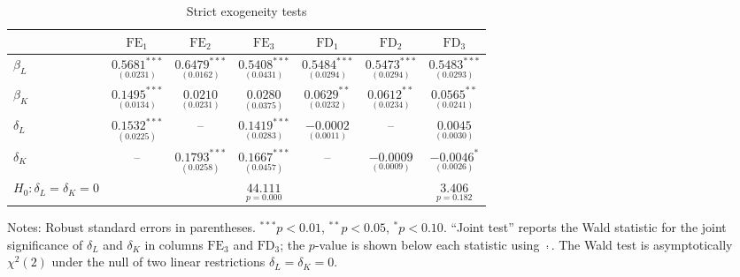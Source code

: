 \begin{table}[H]
\centering
\caption{Strict exogeneity tests}
\label{tab:strict_exog_test}
\begin{tabular}{lcccccc}
\hline
 & $\text{FE}_1$ & $\text{FE}_2$ & $\text{FE}_3$ & $\text{FD}_1$ & $\text{FD}_2$ & $\text{FD}_3$ \\
\hline
$\beta_L$ & $\underset{(0.0231)}{0.5681^{***}}$ & $\underset{(0.0162)}{0.6479^{***}}$ & $\underset{(0.0431)}{0.5408^{***}}$ & $\underset{(0.0294)}{0.5484^{***}}$ & $\underset{(0.0294)}{0.5473^{***}}$ & $\underset{(0.0293)}{0.5483^{***}}$ \\
$\beta_K$ & $\underset{(0.0134)}{0.1495^{***}}$ & $\underset{(0.0231)}{0.0210}$ & $\underset{(0.0375)}{0.0280}$ & $\underset{(0.0232)}{0.0629^{**}}$ & $\underset{(0.0234)}{0.0612^{**}}$ & $\underset{(0.0241)}{0.0565^{**}}$ \\
$\delta_L$ & $\underset{(0.0225)}{0.1532^{***}}$ & -- & $\underset{(0.0283)}{0.1419^{***}}$ & $\underset{(0.0011)}{-0.0002}$ & -- & $\underset{(0.0030)}{0.0045}$ \\
$\delta_K$ & -- & $\underset{(0.0258)}{0.1793^{***}}$ & $\underset{(0.0457)}{0.1667^{***}}$ & -- & $\underset{(0.0009)}{-0.0009}$ & $\underset{(0.0026)}{-0.0046^{*}}$ \\
\hline
$H_0: \delta_L = \delta_K = 0$ &  &  & $\underset{p=0.000}{44.111}$ &  &  & $\underset{p=0.182}{3.406}$ \\
\hline
\end{tabular}

\begin{flushleft}\footnotesize
Notes: Robust standard errors in parentheses. ${}^{***}p<0.01$, ${}^{**}p<0.05$, ${}^{*}p<0.10$.  
“Joint test” reports the Wald statistic for the joint significance of $\delta_L$ and $\delta_K$ in columns $\text{FE}_3$ and $\text{FD}_3$; the $p$-value is shown below each statistic using $\underset{\cdot}{\cdot}$. The Wald test is asymptotically $\chi^2(2)$ under the null of two linear restrictions $\delta_L=\delta_K=0$.
\end{flushleft}
\end{table}
